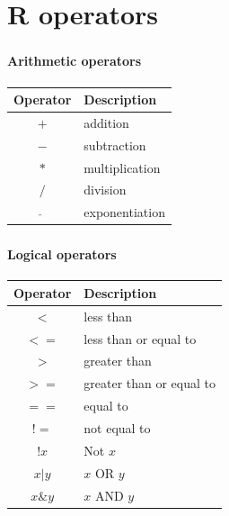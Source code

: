 \documentclass[8pt]{beamer}
\begin{document}


\section{R operators}


\bgroup
{}
\begin{frame}[plain]{}
\begin{center}
\color{white}{\Huge\insertsection}
\end{center}
\end{frame}
\egroup

\begin{frame}
\frametitle{\insertsection}
\framesubtitle{Arithmetic operators}

\centering
\begin{tabular}{cl}
\toprule
\textbf{Operator} & \textbf{Description} \\
\hline
$+$ &         addition\\
$-$ &         subtraction\\
$*$ &         multiplication\\
$/$ &         division\\
$\hat{}$ &    exponentiation\\
\bottomrule
\end{tabular}

\end{frame}



\begin{frame}
\frametitle{\insertsection}
\framesubtitle{Logical operators}

\centering
\begin{tabular}{cl}
\toprule
\textbf{Operator} & \textbf{Description} \\
\hline
$<$	    	& less than\\
$<=$	    & less than or equal to\\
$>$	    	& greater than\\
$>=$	    & greater than or equal to\\
$==$	    & equal to\\
$!=$	    & not equal to\\
$!x$	    & Not $x$\\
$x \vert y$ & $x$ OR $y$\\
$x \& y$	& $x$ AND $y$\\

\bottomrule
\end{tabular}

\end{frame}
\end{document}
